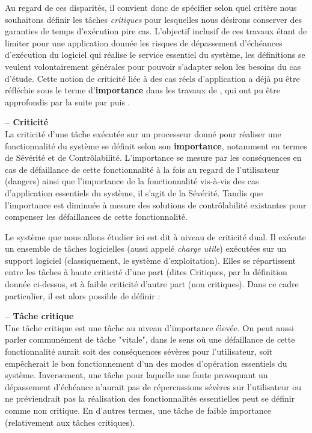 \documentclass[french, a4paper, 11pt, twoside, pdftex]{StyleThese}
\begin{document}
	Au regard de ces disparités, il convient donc de spécifier selon quel critère nous souhaitons définir les tâches \textit{critiques} pour lesquelles nous désirons conserver des garanties de temps d'exécution pire cas. L'objectif inclusif de ces travaux étant de limiter pour une application donnée les risques de dépassement d'échéances d'exécution du logiciel qui réalise le service essentiel du système, les définitions se veulent volontairement générales pour pouvoir s'adapter selon les besoins du cas d'étude. Cette notion de criticité liée à des cas réels d'application a déjà pu être réfléchie sous le terme d'\textbf{importance} dans les travaux de \cite{fleming_extending_2013}, qui ont pu être approfondis par la suite par \cite{bletsas_decoupling_2018} puis \cite{sundar_practical_2019}.
	
	\begin{definition}\textbf{ -- Criticité} \\
		La criticité d'une tâche exécutée sur un processeur donné pour réaliser une fonctionnalité du système se définit selon son \textbf{importance}, notamment en termes de Sévérité et de Contrôlabilité. L'importance se mesure par les conséquences en cas de défaillance de cette fonctionnalité à la fois au regard de l'utilisateur (dangers) ainsi que l'importance de la fonctionnalité vis-à-vis des cas d'application essentiels du système, il s'agit de la Sévérité. Tandis que l'importance est diminuée à mesure des solutions de contrôlabilité existantes pour compenser les défaillances de cette fonctionnalité.
	\end{definition}

    Le système que nous allons étudier ici est dit à niveau de criticité dual. Il exécute un ensemble de tâches logicielles (aussi appelé \textit{charge utile}) exécutées sur un support logiciel (classiquement, le système d'exploitation). Elles se répartissent entre les tâches à haute criticité d'une part (dites Critiques, par la définition donnée ci-dessus, et à faible criticité d'autre part (non critiques). 	Dans ce cadre particulier, il est alors possible de définir : 
    
    \begin{definition}\textbf{ -- Tâche critique} \\
    	Une tâche critique est une tâche au niveau d'importance élevée. On peut aussi parler communément de tâche "vitale", dans le sens où une défaillance de cette fonctionnalité aurait soit des conséquences sévères pour l'utilisateur, soit empêcherait le bon fonctionnement d'un des modes d'opération essentiels du système.
    	Inversement, une tâche pour laquelle une faute provoquant un dépassement d'échéance n'aurait pas de répercussions sévères sur l'utilisateur ou ne préviendrait pas la réalisation des fonctionnalités essentielles peut se définir comme non critique. En d'autres termes, une tâche de faible importance (relativement aux tâches critiques).
    \end{definition}
    
\end{document}
